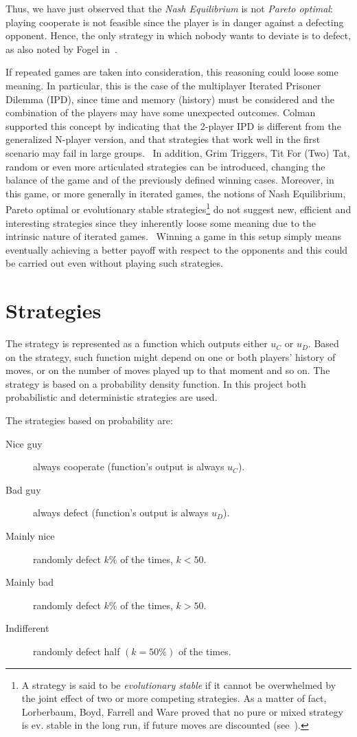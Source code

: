 \documentclass[journal,10pt,twoside]{IEEEtran}
\begin{document}
Thus, we have just observed that the \textit{Nash Equilibrium} is not \textit{Pareto optimal}: playing cooperate is not feasible since the player is in danger against a defecting opponent. Hence, the only strategy in which nobody wants to deviate is to defect, as also noted by Fogel in~\cite{fogelEvolvingBehaviors}.

If repeated games are taken into consideration, this reasoning could loose some meaning. In particular, this is the case of the multiplayer Iterated Prisoner Dilemma (IPD), since time and memory (history) must be considered and the combination of the players may have some unexpected outcomes.
Colman supported this concept by indicating that the 2-player IPD is different from the generalized N-player version, and that strategies that work well in the first scenario may fail in large groups.~\cite{yao1994experimental}
In addition, Grim Triggers, Tit For (Two) Tat, random or even more articulated strategies can be introduced, changing the balance of the game and of the previously defined winning cases.
Moreover, in this game, or more generally in iterated games, the notions of Nash Equilibrium, Pareto optimal or evolutionary stable strategies\footnote{A strategy is said to be \textit{evolutionary stable} if it cannot be overwhelmed by the joint effect of two or more competing strategies. As a matter of fact, Lorberbaum, Boyd, Farrell and Ware proved that no pure or mixed strategy is ev. stable in the long run, if future moves are discounted (see~\cite{lorb94}).} do not suggest new, efficient and interesting strategies since they inherently loose some meaning due to the intrinsic nature of iterated games.~\cite{mathieu2017}
Winning a game in this setup simply means eventually achieving a better payoff with respect to the opponents and this could be carried out even without playing such strategies.

\section{Strategies} \label{s:str}
The strategy is represented as a function which outputs either $u_C$ or $u_D$. Based on the strategy, such function might depend on one or both players' history of moves, or on the number of moves played up to that moment and so on.
The strategy is based on a probability density function. In this project both probabilistic and deterministic strategies are used.

The strategies based on probability are:
\begin{description}
    \item[Nice guy] always cooperate (function's output is always $u_C$).
    \item[Bad guy] always defect (function's output is always $u_D$).
    \item[Mainly nice] randomly defect $k\%$ of the times, $k<50$.
    \item[Mainly bad] randomly defect $k\%$ of the times, $k>50$.
    \item[Indifferent] randomly defect half $(k=50\%)$ of the times.
\end{description}
\end{document}
